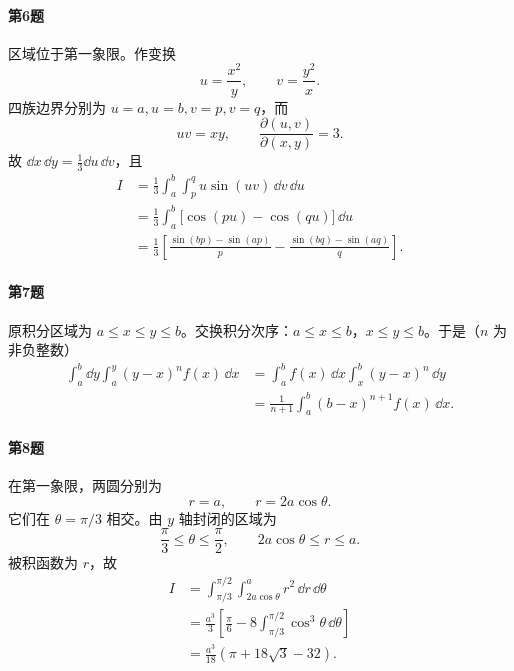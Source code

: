 \paragraph{第6题}
\begin{xsolution}
区域位于第一象限。作变换
\[
  u=\frac{x^2}{y},\qquad v=\frac{y^2}{x}.
\]
四族边界分别为 $u=a,u=b,v=p,v=q$，而
\[
  uv=xy,
  \qquad
  \frac{\partial(u,v)}{\partial(x,y)}=3.
\]
故 $\dd x\,\dd y=\frac13\dd u\,\dd v$，且
\begin{align*}
 I&=\frac13\int_a^b\int_p^q u\sin(uv)\,\dd v\,\dd u\\
 &=\frac13\int_a^b\bigl[\cos(pu)-\cos(qu)\bigr]\,\dd u\\
 &=\boxed{\frac13\left[
 \frac{\sin(bp)-\sin(ap)}p-
 \frac{\sin(bq)-\sin(aq)}q\right]}.
\end{align*}
\end{xsolution}

\paragraph{第7题}
\begin{xsolution}
原积分区域为 $a\le x\le y\le b$。交换积分次序：$a\le x\le b$，$x\le y\le b$。于是（$n$ 为非负整数）
\begin{align*}
 \int_a^b\dd y\int_a^y(y-x)^nf(x)\,\dd x
 &=\int_a^b f(x)\,\dd x\int_x^b(y-x)^n\,\dd y\\
 &=\frac1{n+1}\int_a^b(b-x)^{n+1}f(x)\,\dd x.
\end{align*}
\end{xsolution}

\paragraph{第8题}
\begin{xsolution}
在第一象限，两圆分别为
\[
  r=a,
  \qquad r=2a\cos\theta.
\]
它们在 $\theta=\pi/3$ 相交。由 $y$ 轴封闭的区域为
\[
  \frac\pi3\le\theta\le\frac\pi2,
  \qquad2a\cos\theta\le r\le a.
\]
被积函数为 $r$，故
\begin{align*}
 I&=\int_{\pi/3}^{\pi/2}\int_{2a\cos\theta}^{a}r^2\,\dd r\,\dd\theta\\
 &=\frac{a^3}{3}\left[\frac\pi6-8\int_{\pi/3}^{\pi/2}\cos^3\theta\,\dd\theta\right]\\
 &=\boxed{\frac{a^3}{18}\left(\pi+18\sqrt3-32\right)}.
\end{align*}
\end{xsolution}

